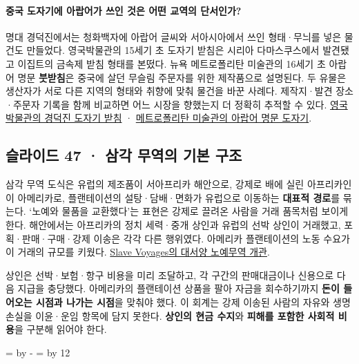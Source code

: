 \documentclass[10pt,a4paper]{article}
\newcommand{\ReserveQuestionSpace}{%
  \par\begingroup
  \dimen0=\pagegoal \advance\dimen0 by -\pagetotal
  \dimen2=\baselineskip \multiply\dimen2 by 12
  \ifdim\dimen0<\dimen2 \newpage\fi
  \endgroup}
\begin{document}
\paragraph{중국 도자기에 아랍어가 쓰인 것은 어떤 교역의 단서인가?}
명대 경덕진에서는 청화백자에 아랍어 글씨와 서아시아에서 쓰인 형태·무늬를 넣은 물건도 만들었다. 영국박물관의 15세기 초 도자기 받침은 시리아 다마스쿠스에서 발견됐고 이집트의 금속제 받침 형태를 본떴다. 뉴욕 메트로폴리탄 미술관의 16세기 초 아랍어 명문 \textbf{붓받침}은 중국에 살던 무슬림 주문자를 위한 제작품으로 설명된다. 두 유물은 생산자가 서로 다른 지역의 형태와 취향에 맞춰 물건을 바꾼 사례다. 제작지·발견 장소·주문자 기록을 함께 비교하면 어느 시장을 향했는지 더 정확히 추적할 수 있다. \href{https://islamicworld.britishmuseum.org/collection/RRC14627}{영국박물관의 경덕진 도자기 받침} · \href{https://www.metmuseum.org/ru/learn/educators/curriculum-resources/art-of-the-islamic-world/unit-seven/chapter-one/the-importance-of-ceramics}{메트로폴리탄 미술관의 아랍어 명문 도자기}.\par

\subsection{슬라이드 47 · 삼각 무역의 기본 구조}
삼각 무역 도식은 유럽의 제조품이 서아프리카 해안으로, 강제로 배에 실린 아프리카인이 아메리카로, 플랜테이션의 설탕·담배·면화가 유럽으로 이동하는 \textbf{대표적 경로}를 묶는다. ‘노예와 물품을 교환했다’는 표현은 강제로 끌려온 사람을 거래 품목처럼 보이게 한다. 해안에서는 아프리카의 정치 세력·중개 상인과 유럽의 선박 상인이 거래했고, 포획·판매·구매·강제 이송은 각각 다른 행위였다. 아메리카 플랜테이션의 노동 수요가 이 거래의 규모를 키웠다. \href{https://legacy.slavevoyages.org/blog/brief-overview-trans-atlantic-slave-trade}{Slave Voyages의 대서양 노예무역 개관}.\par

상인은 선박·보험·항구 비용을 미리 조달하고, 각 구간의 판매대금이나 신용으로 다음 지급을 충당했다. 아메리카의 플랜테이션 상품을 팔아 자금을 회수하기까지 \textbf{돈이 들어오는 시점과 나가는 시점}을 맞춰야 했다. 이 회계는 강제 이송된 사람의 자유와 생명 손실을 이윤·운임 항목에 담지 못한다. \textbf{상인의 현금 수지}와 \textbf{피해를 포함한 사회적 비용}을 구분해 읽어야 한다.\par

\ReserveQuestionSpace
\end{document}
